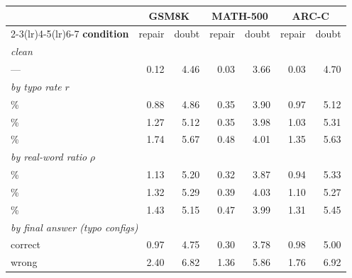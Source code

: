\begin{tabular}{l rr rr rr}
\toprule
& \multicolumn{2}{c}{\textbf{GSM8K}} & \multicolumn{2}{c}{\textbf{MATH-500}} & \multicolumn{2}{c}{\textbf{ARC-C}} \\
\cmidrule(lr){2-3}\cmidrule(lr){4-5}\cmidrule(lr){6-7}
\textbf{condition} & repair & doubt & repair & doubt & repair & doubt \\
\midrule
\multicolumn{7}{l}{\emph{clean}} \\
\quad --- & 0.12 & 4.46 & 0.03 & 3.66 & 0.03 & 4.70 \\
\midrule \multicolumn{7}{l}{\emph{by typo rate }$r$} \\
\quad 25\% & 0.88 & 4.86 & 0.35 & 3.90 & 0.97 & 5.12 \\
\quad 50\% & 1.27 & 5.12 & 0.35 & 3.98 & 1.03 & 5.31 \\
\quad 75\% & 1.74 & 5.67 & 0.48 & 4.01 & 1.35 & 5.63 \\
\midrule \multicolumn{7}{l}{\emph{by real-word ratio }$\rho$} \\
\quad 10\% & 1.13 & 5.20 & 0.32 & 3.87 & 0.94 & 5.33 \\
\quad 40\% & 1.32 & 5.29 & 0.39 & 4.03 & 1.10 & 5.27 \\
\quad 70\% & 1.43 & 5.15 & 0.47 & 3.99 & 1.31 & 5.45 \\
\midrule \multicolumn{7}{l}{\emph{by final answer (typo configs)}} \\
\quad correct & 0.97 & 4.75 & 0.30 & 3.78 & 0.98 & 5.00 \\
\quad wrong & 2.40 & 6.82 & 1.36 & 5.86 & 1.76 & 6.92 \\
\bottomrule
\end{tabular}
